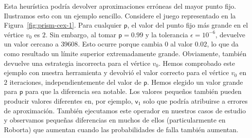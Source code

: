 Esta heurística podría devolver aproximaciones erróneas del mayor punto fijo. Ilustramos esto con un ejemplo sencillo. Considere el juego representado en la Figura~\ref{fig:prism-cex-1}. Para cualquier $\textsf{p}$, el valor del punto fijo más grande en el vértice $v_0$ es $2$. Sin embargo, al tomar $\textsf{p}=0.99$ y la tolerancia $\epsilon=10^{-6}$, {\Prism} devuelve un valor cercano a $39608$. %
Esto ocurre porque {\Prism} cambia $0$ al valor $0.02$, lo que da como resultado un límite superior extremadamente grande.
Obviamente, también devuelve una estrategia incorrecta para el vértice $v_0$. Hemos comprobado este ejemplo con nuestra herramienta y devolvió el valor correcto para el vértice $v_0$ en $2$ iteraciones, independientemente del valor de $\textsf{p}$.
%
Hemos elegido un valor grande para $\textsf{p}$ para que la diferencia sea notable. Los valores pequeños también pueden producir valores diferentes en, por ejemplo, $\textsf{v}_1$ solo que podría atribuirse a errores de aproximación.
%
%
También ejecutamos este operador en nuestros casos de estudio y observamos pequeñas diferencias en muchos de ellos (particularmente en Roborta) que aumentan cuando las probabilidades de falla también aumentan.




